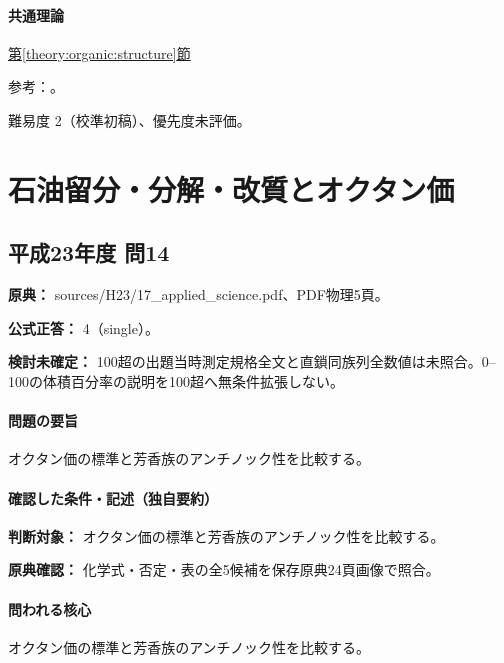 \paragraph{共通理論} \hyperref[theory:organic:structure]{第\ref*{theory:organic:structure}節}

\par 参考：\cite{organic_chirality,organic_benzene}。

\par 難易度 2（校準初稿）、優先度未評価。

\section{石油留分・分解・改質とオクタン価}

\subsection{平成23年度 問14}
\label{q:h23-reg-applied-14}

\noindent\textbf{原典：} sources/H23/17\_applied\_science.pdf、PDF物理5頁。

\textbf{公式正答：} 4（single）。

\par\textbf{検討未確定：} 100超の出題当時測定規格全文と直鎖同族列全数値は未照合。0–100の体積百分率の説明を100超へ無条件拡張しない。

\paragraph{問題の要旨} オクタン価の標準と芳香族のアンチノック性を比較する。

\paragraph{確認した条件・記述（独自要約）}\mbox{}\par

\noindent\textbf{判断対象：} オクタン価の標準と芳香族のアンチノック性を比較する。\par

\noindent\textbf{原典確認：} 化学式・否定・表の全5候補を保存原典24頁画像で照合。\par

\paragraph{問われる核心} オクタン価の標準と芳香族のアンチノック性を比較する。

